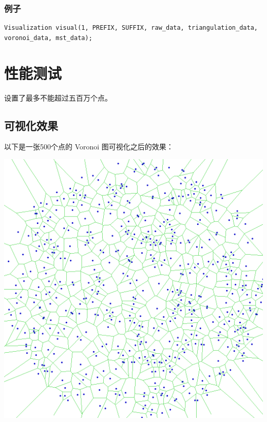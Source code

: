 \documentclass[a4paper]{article}
\begin{document}
\subsubsection{例子}
\begin{lstlisting}
Visualization visual(1, PREFIX, SUFFIX, raw_data, triangulation_data, voronoi_data, mst_data);
\end{lstlisting}
\section{性能测试}
设置了最多不能超过五百万个点。

\subsection{可视化效果}
以下是一张500个点的 Voronoi 图可视化之后的效果：\\
\begin{center}
\includegraphics[width=1\linewidth]{../testcase/circle_500/voronoi.png}	
\end{center}
\end{document}
